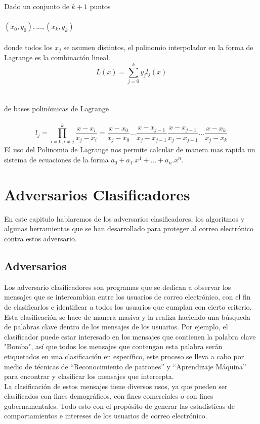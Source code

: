 \documentclass[12pt,oneside,onecolumn,openany]{report}
\begin{document}
 Dado un conjunto de $k + 1$ puntos\\\\
 $(x_0,y_0),...,(x_k,y_k)$\\\\
 donde todos los $x_j$ se asumen distintos, el polinomio interpolador en la forma de Lagrange es la combinación lineal.
 \begin{equation}
  L(x)=\sum_{j=0}^{k}y_jl_j(x)
 \end{equation}
 \\\\
 de bases polinómicas de Lagrange\\\\
 \begin{equation}
  l_j=\prod_{i=0,i\neq j}^{k}\frac{x-x_i}{x_j-x_i}=\frac{x-x_0}{x_j-x_0}...\frac{x-x_{j-1}}{x_j-x_{j-1}}\frac{x-x_{j+1}}{x_j-x_{j+1}}...\frac{x-x_k}{x_j-x_k}
 \end{equation}
El uso del Polinomio de Lagrange nos permite calcular de manera mas rapida un sistema de ecuaciones de la forma $a_0+a_1.x^1+...+a_n.x^n$.

\chapter{Adversarios Clasificadores}

En este capitulo hablaremos de los adversarios clasificadores, los algoritmos y algunas herramientas que se han desarrollado para proteger al correo electrónico contra estos adversario.

\section{Adversarios}

Los adversario clasificadores son programas que se dedican a observar los mensajes que se intercambian  entre  los  usuarios  de  correo  electrónico,  con  el  fin  de  clasificarlos  e 
identificar  a  todos  los  usuarios  que  cumplan  con  cierto  criterio.  Esta  clasificación  se hace de manera masiva y la realiza haciendo una búsqueda de palabras clave dentro de 
los  mensajes de  los usuarios. Por ejemplo, el  clasificador puede estar interesado en  los mensajes  que  contienen  la  palabra  clave  "Bomba",  así  que 
todos  los  mensajes  que contengan esta palabra serán etiquetados en una clasificación en específico, este proceso se lleva a cabo por medio de técnicas de 
“Reconocimiento de patrones” y “Aprendizaje Máquina” para encontrar y clasificar los mensajes que intercepta.\cite{clas,Attacks}
\\
La  clasificación  de  estos  mensajes  tiene  diversos  usos, ya  que  pueden  ser  clasificados con  fines demográficos, con  fines comerciales o con  fines gubernamentales. Todo esto 
con  el  propósito  de  generar  las  estadísticas  de  comportamientos  e  intereses  de  los usuarios de correo electrónico. \\
\end{document}
